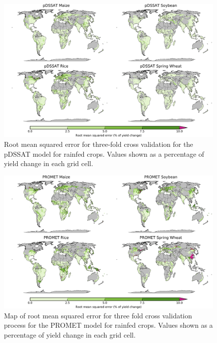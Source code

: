 \documentclass[12pt]{article}
\begin{document}
\begin{figure}[h!]
  \centering
  \includegraphics[width=15.5cm]{pDSSAT_spatial_MSE_ton_ha.png}
  \caption{Root mean squared error for three-fold cross validation for the pDSSAT model for rainfed crops. Values shown as a percentage of yield change in each grid cell.}
\end{figure}

\begin{figure}[h!]
  \centering
  \includegraphics[width=15.5cm]{PROMET_spatial_MSE_ton_ha.png}
  \caption{Map of root mean squared error for three fold cross validation process for the PROMET model for rainfed crops. Values shown as a percentage of yield change in each grid cell.}
\end{figure}
\end{document}
